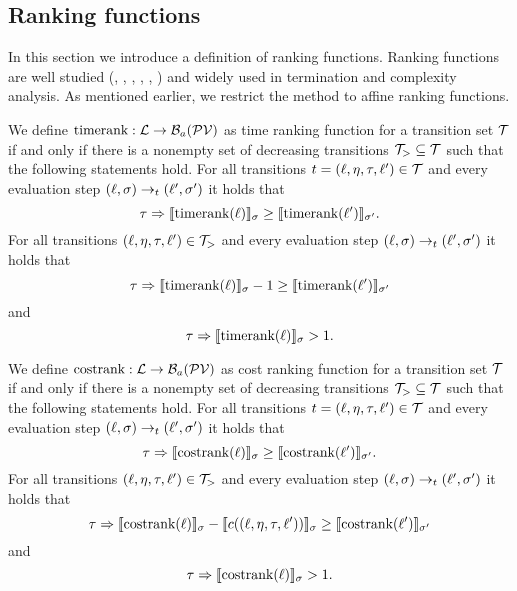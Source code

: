 \subsection{Ranking functions}

In this section we introduce a definition of ranking functions.
Ranking functions are well studied (\cite{bradley2005polyranking}, \cite{podelski2004prf}, \cite{bradley2005linear}, \cite{bagnara2012new}, \cite{leike2014ranking}, \cite{ben2013linear}) and widely used in termination and complexity analysis.
As mentioned earlier, we restrict the method to affine ranking functions.

\begin{definition} 
	We define $\text{timerank}: \mathcal{L} \rightarrow \mathcal{B}_a(\mathcal{PV})$ as time ranking function for a transition set $\mathcal{T}$ if and only if there is a nonempty set of decreasing transitions $\mathcal{T}_{>} \subseteq \mathcal{T}$ such that the following statements hold.
        For all transitions $t = (\ell, \eta, \tau, \ell') \in \mathcal{T}$ and every evaluation step $(\ell, \sigma) \rightarrow_t (\ell', \sigma')$ it holds that
	\[ \tau \Rightarrow \llbracket \text{timerank}(\ell) \rrbracket_{\sigma} \geq \llbracket \text{timerank}(\ell') \rrbracket_{\sigma'}. \]
        For all transitions $(\ell, \eta, \tau, \ell') \in \mathcal{T}_{>}$ and every evaluation step $(\ell, \sigma) \rightarrow_t (\ell', \sigma')$ it holds that        
	\[ \tau \Rightarrow \llbracket \text{timerank}(\ell) \rrbracket_{\sigma} - 1 \geq \llbracket \text{timerank}(\ell') \rrbracket_{\sigma'} \]
        and
	\[ \tau \Rightarrow \llbracket \text{timerank}(\ell) \rrbracket_{\sigma} > 1. \]
\end{definition}

\begin{definition} 
	We define $\text{costrank}: \mathcal{L} \rightarrow \mathcal{B}_a(\mathcal{PV})$ as cost ranking function for a transition set $\mathcal{T}$ if and only if there is a nonempty set of decreasing transitions $\mathcal{T}_{>} \subseteq \mathcal{T}$ such that the following statements hold.
        For all transitions $t = (\ell, \eta, \tau, \ell') \in \mathcal{T}$ and every evaluation step $(\ell, \sigma) \rightarrow_t (\ell', \sigma')$ it holds that
	\[ \tau \Rightarrow \llbracket \text{costrank}(\ell) \rrbracket_{\sigma} \geq \llbracket \text{costrank}(\ell') \rrbracket_{\sigma'}. \]
        For all transitions $(\ell, \eta, \tau, \ell') \in \mathcal{T}_{>}$ and every evaluation step $(\ell, \sigma) \rightarrow_t (\ell', \sigma')$ it holds that        
	\[ \tau \Rightarrow \llbracket \text{costrank}(\ell) \rrbracket_{\sigma} - \llbracket c((\ell, \eta, \tau, \ell')) \rrbracket_{\sigma} \geq \llbracket \text{costrank}(\ell') \rrbracket_{\sigma'} \]
        and
	\[ \tau \Rightarrow \llbracket \text{costrank}(\ell) \rrbracket_{\sigma} > 1. \]
\end{definition}

